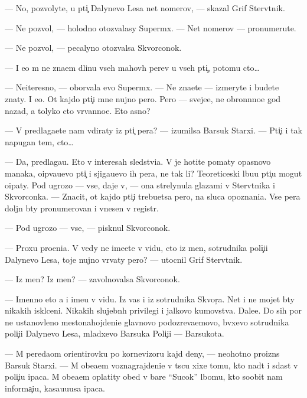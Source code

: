 \documentclass[12pt]{book}
\begin{document}
— No, pozvolyte, u pti{\c} Dalynevo Lesa net nomerov, — skazal Grif Sterv{\ia}tnik.

— Ne pozvol{\io}, — holodno otozvalasy Superm{\yi}x. — Net nomerov — pronumeru{\y}te.

— Ne pozvol{\io}, — pecalyno otozvalsa Skvorconok.

— I {\y}e{\x}o m{\yi} ne zna{\y}em dlinu vseh mahov{\yi}h per{\y}ev u vseh pti{\c}, potomu cto…

— Neiteresno, — oborvala {\y}evo Superm{\yi}x. — Ne zna{\y}ete — izmeryte i budete znaty. I {\y}e{\x}o. Ot kajdo{\y} pti{\c}i mne nujno pero. Pero — sveje{\y}e, ne obron{\e}nno{\y}e god nazad, a tolyko cto v{\yi}rvanno{\y}e. Eto {\y}asno?

— V{\yi} predlaga{\y}ete nam v{\yi}diraty iz pti{\c} per{\y}a? — izumilsa Barsuk Starxi{\y}. — Pti{\c}i i tak napugan{\yi} tem, cto…

— Da, predlaga{\y}u. Eto v interesah sledstvi{\y}a. V{\yi} je hotite po{\y}maty opasnovo man{\y}aka, o{\x}ip{\yi}va{\y}u{\x}evo pti{\c} i sjiga{\y}u{\x}evo ih per{\y}a, ne tak li? Teoreticeski l{\io}bu{\y}u pti{\c}u mogut o{\x}ipaty. Pod ugrozo{\y} — vse, daje v{\yi}, — ona strelynula glaza\-mi v Sterv{\ia}tnika i Skvorconka. — Znacit, ot kajdo{\y} pti{\c}i trebu{\y}etsa pero, na sluca{\y} opoznani{\y}a. Vse per{\y}a doljn{\yi} b{\yi}ty pronumerovan{\yi} i vnesen{\yi} v registr.

— Pod ugrozo{\y} — vse, — pisknul Skvorconok.

— Proxu pro{\x}eni{\y}a. V{\yi} vedy ne ime{\y}ete v vidu, cto iz men{\ia}, sotrudnika poli{\c}i{\y}i Dalynevo Lesa, toje nujno v{\yi}rvaty pero? — utocnil Grif Sterv{\ia}tnik.

— Iz men{\ia}? Iz men{\ia}? — zavolnovalsa Skvorconok.

— Imenno eto {\y}a i ime{\y}u v vidu. Iz vas i iz sotrudnika Skvor{\c}a. Net i ne mojet b{\yi}ty nikakih iskl{\io}ceni{\y}. Nikakih slujebn{\yi}h privilegi{\y} i jalkovo kumovstva. Dale{\y}e. Do sih por ne ustanovleno mestonahojdeni{\y}e glavnovo podozreva{\y}emovo, b{\yi}vxevo sotrudnika poli{\c}i{\y}i Dalynevo Lesa, mladxevo Barsuka Poli{\c}i{\y}i — Barsukota.

— M{\yi} pereda{\y}om orientirovku po kornevizoru kajd{\yi}{\y} deny, — neohotno proizn{\e}s Barsuk Starxi{\y}. — M{\yi} obe{\x}a{\y}em voznagrajdeni{\y}e v t{\yi}s{\ia}cu xixe{\y} tomu, kto na{\y}d{\e}t i sdast v poli{\c}i{\y}u {\X}ipaca. M{\yi} obe{\x}a{\y}em oplatity obed v bare ``Sucok'' l{\io}bomu, kto soob{\x}it nam informa{\c}i{\y}u, kasa{\y}u{\x}u{\y}usa {\X}ipaca.
\end{document}
